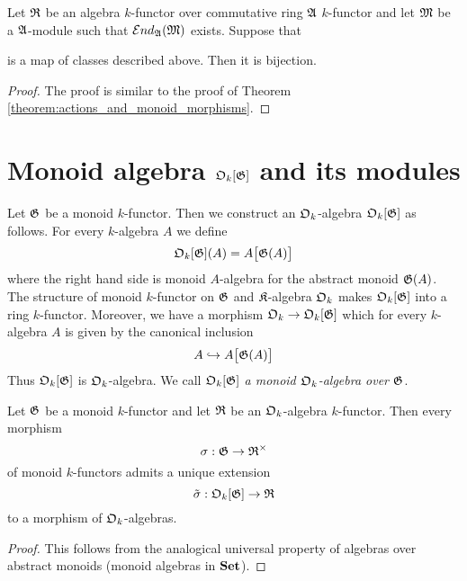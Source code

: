 \begin{theorem}\label{theorem:linear_morphisms_and_homomorphisms_of_rings}
Let ${\mathfrak R}$ be an algebra $k$-functor over commutative ring ${\mathfrak A}$ $k$-functor and let ${\mathfrak M}$ be a ${\mathfrak A}$-module such that ${\mathcal E} nd_{{\mathfrak A}}({\mathfrak M})$ exists. Suppose that
\begin{center}
\end{center}
is a map of classes described above. Then it is bijection.
\end{theorem}
\begin{proof}
The proof is similar to the proof of Theorem \ref{theorem:actions_and_monoid_morphisms}.
\end{proof}


\section{Monoid algebra ${\mathfrak O}_k[{\mathfrak G}]$ and its modules}

\begin{definition}
Let ${\mathfrak G}$ be a monoid $k$-functor. Then we construct an ${\mathfrak O}_k$-algebra ${\mathfrak O}_k[{\mathfrak G}]$ as follows. For every $k$-algebra $A$ we define
$${\mathfrak O}_k[{\mathfrak G}](A) = A\big[{\mathfrak G}(A)\big]$$
where the right hand side is monoid $A$-algebra for the abstract monoid ${\mathfrak G}(A)$. The structure of monoid $k$-functor on ${\mathfrak G}$ and ${\mathfrak K}$-algebra ${\mathfrak O}_k$ makes ${\mathfrak O}_k[{\mathfrak G}]$ into a ring $k$-functor. Moreover, we have a morphism ${\mathfrak O}_k\rightarrow {\mathfrak O}_k[{\mathfrak G}]$ which for every $k$-algebra $A$ is given by the canonical inclusion
$$A \hookrightarrow A\big[{\mathfrak G}(A)\big]$$
Thus ${\mathfrak O}_k[{\mathfrak G}]$ is ${\mathfrak O}_k$-algebra. We call ${\mathfrak O}_k[{\mathfrak G}]$ \textit{a monoid ${\mathfrak O}_k$-algebra over ${\mathfrak G}$}.
\end{definition}

\begin{fact}\label{fact:universal_property_of_monoid_algebra}
Let ${\mathfrak G}$ be a monoid $k$-functor and let ${\mathfrak R}$ be an ${\mathfrak O}_k$-algebra $k$-functor. Then every morphism
$$\sigma:{\mathfrak G}\rightarrow {\mathfrak R}^{\times}$$
of monoid $k$-functors admits a unique extension
$$\tilde{\sigma}:{\mathfrak O}_k[{\mathfrak G}]\rightarrow {\mathfrak R}$$
to a morphism of ${\mathfrak O}_k$-algebras.
\end{fact}
\begin{proof}
This follows from the analogical universal property of algebras over abstract monoids (monoid algebras in $\mathbf{Set}$).
\end{proof}

